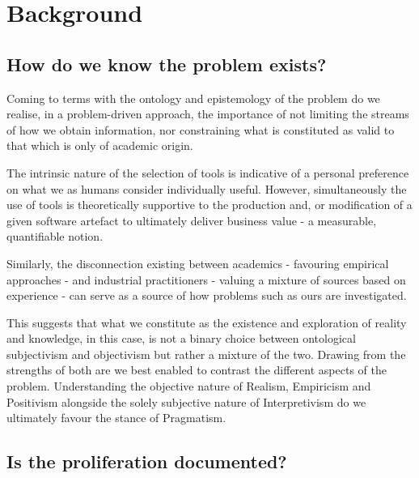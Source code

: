 \chapter{Background}

\section{How do we know the problem exists?}

Coming to terms with the ontology and epistemology of the problem do we realise, in a problem-driven approach, the importance of not limiting the streams of how we obtain information, nor constraining what is constituted as valid to that which is only of academic origin.

The intrinsic nature of the selection of tools is indicative of a personal preference on what we as humans consider individually useful. However, simultaneously the use of tools is theoretically supportive to the production and, or modification of a given software artefact to ultimately deliver business value - a measurable, quantifiable notion.

Similarly, the disconnection existing between academics - favouring empirical approaches - and industrial practitioners - valuing a mixture of sources based on experience - can serve as a source of how problems such as ours are investigated.

This suggests that what we constitute as the existence and exploration of reality and knowledge, in this case, is not a binary choice between ontological subjectivism and objectivism but rather a mixture of the two. Drawing from the strengths of both are we best enabled to contrast the different aspects of the problem. Understanding the objective nature of Realism, Empiricism and Positivism alongside the solely subjective nature of Interpretivism do we ultimately favour the stance of Pragmatism.

\section{Is the proliferation documented?}




